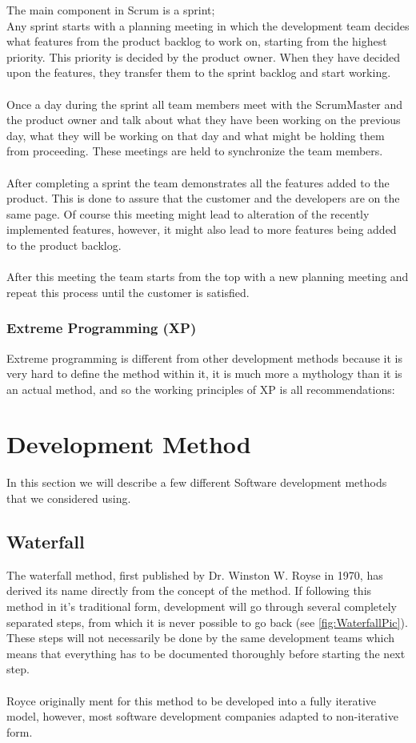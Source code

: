 The main component in Scrum is a sprint; \\
Any sprint starts with a planning meeting in which the development team decides what features from the product backlog to work on, starting from the highest priority. This priority is decided by the product owner. When they have decided upon the features, they transfer them to the sprint backlog and start working. \\
\\
Once a day during the sprint all team members meet with the ScrumMaster and the product owner and talk about what they have been working on the previous day, what they will be working on that day and what might be holding them from proceeding. These meetings are held to synchronize the team members.\\
\\
After completing a sprint the team demonstrates all the features added to the product. This is done to assure that the customer and the developers are on the same page. Of course this meeting might lead to alteration of the recently implemented features, however, it might also lead to more features being added to the product backlog.\\
\\
After this meeting the team starts from the top with a new planning meeting and repeat this process until the customer is satisfied.
\cite{goat} \cite{scrum}
\subsubsection{Extreme Programming (XP)}
Extreme programming is different from other development methods because it is very hard to define the method within it, it is much more a mythology than it is an actual method, and so the working principles of XP is all recommendations:
\section{Development Method}
\label{sec:DevelopmentMethods}
In this section we will describe a few different Software development methods that we considered using.

\subsection{Waterfall}
The waterfall method, first published by Dr. Winston W. Royse in 1970, has derived its name directly from the concept of the method. If following this method in it's traditional form, development will go through several completely separated steps, from which it is never possible to go back (see \ref{fig:WaterfallPic}). These steps will not necessarily be done by the same development teams which means that everything has to be documented thoroughly before starting the next step.\\
 \\
Royce originally ment for this method to be developed into a fully iterative model, however, most software development companies adapted to non-iterative form.
\cite{waterfallroyce}

